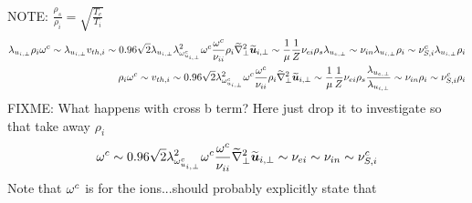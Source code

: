 NOTE: $\frac{\rho_s}{\rho_i}=\sqrt{\frac{T_e}{T_i}}$
%
\begin{align*}
 \lambda_{u_{i,\perp}}
 \rho_i
 \om^c
%
 \sim
 \lambda_{u_{i,\perp}}
 v_{th,i}
%
 \sim
0.96\sqrt{2}
 \lambda_{u_{i,\perp}}
\lambda_{\om^c_{u_{i,\perp}}}^2
 \om^c
\frac{\om^c}{\nu_{ii} }
\rho_i
\wt{\grad}_\perp^2\wt{\ve{u}}_{i,\perp}
%
 \sim
\frac{1}{\mu}
\frac{1}{Z}
\nu_{ei}
\rho_s
\lambda_{u_{e,\perp}}
%
 \sim
\nu_{i n}\lambda_{u_{i,\perp}}\rho_i
%
 \sim
\nu^c_{S,i}\lambda_{u_{i,\perp}}\rho_i
\\
%
%
%
 \rho_i
 \om^c
%
 \sim
 v_{th,i}
%
 \sim
0.96\sqrt{2}
\lambda_{\om^c_{u_{i,\perp}}}^2
 \om^c
\frac{\om^c}{\nu_{ii} }
\rho_i
\wt{\grad}_\perp^2\wt{\ve{u}}_{i,\perp}
%
 \sim
\frac{1}{\mu}
\frac{1}{Z}
\nu_{ei}
\rho_s
\frac{\lambda_{u_{e,\perp}}}{\lambda_{u_{i,\perp}}}
%
 \sim
\nu_{i n}
\rho_i
%
 \sim
\nu^c_{S,i}
\rho_i
\\
\end{align*}
%
FIXME: What happens with cross b term? Here just drop it to investigate
so that take away $\rho_i$
%
\begin{align*}
 \om^c
%
 \sim
0.96\sqrt{2}
\lambda_{\om^c_{u_{i,\perp}}}^2
 \om^c
\frac{\om^c}{\nu_{ii} }
\wt{\grad}_\perp^2\wt{\ve{u}}_{i,\perp}
%
 \sim
\nu_{ei}
%
 \sim
\nu_{i n}
%
 \sim
\nu^c_{S,i}
\end{align*}
%
Note that $\omega^c$ is for the ions...should probably explicitly state that
